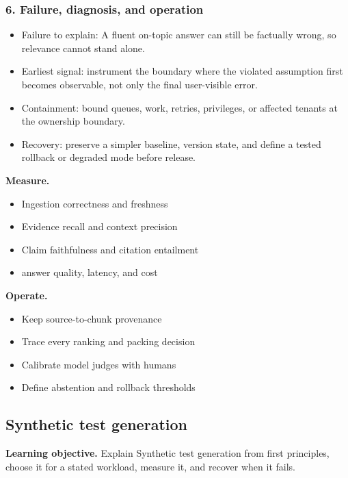 \subsubsection*{6. Failure, diagnosis, and operation}
\begin{itemize}
\item Failure to explain: A fluent on-topic answer can still be factually wrong, so relevance cannot stand alone.
\item Earliest signal: instrument the boundary where the violated assumption first becomes observable, not only the final user-visible error.
\item Containment: bound queues, work, retries, privileges, or affected tenants at the ownership boundary.
\item Recovery: preserve a simpler baseline, version state, and define a tested rollback or degraded mode before release.
\end{itemize}
\textbf{Measure.}\begin{itemize}
\item Ingestion correctness and freshness
\item Evidence recall and context precision
\item Claim faithfulness and citation entailment
\item answer quality, latency, and cost
\end{itemize}
\textbf{Operate.}\begin{itemize}
\item Keep source-to-chunk provenance
\item Trace every ranking and packing decision
\item Calibrate model judges with humans
\item Define abstention and rollback thresholds
\end{itemize}
\subsection{Synthetic test generation}
\textbf{Learning objective.} Explain Synthetic test generation from first principles, choose it for a stated workload, measure it, and recover when it fails.
